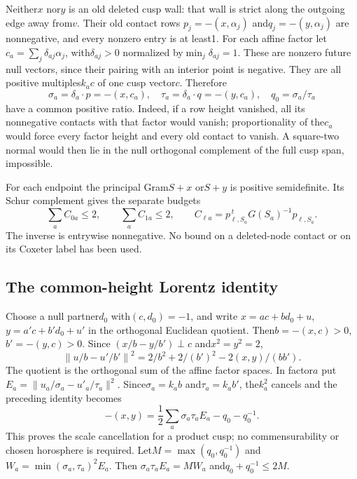 \documentclass[11pt]{article}
\theoremstyle{remark}\newtheorem{remark}[theorem]{Remark}
\begin{document}
Neither$x$ nor$y$ is an old deleted cusp wall: that wall is strict
along the outgoing edge away from$v$. Their old contact rows
$p_j=-(x,\alpha_j)$ and$q_j=-(y,\alpha_j)$ are nonnegative,
and every nonzero entry is at least1. For each affine factor let
$c_a=\sum_j\delta_{aj}\alpha_j$, with$\delta_{aj}>0$ normalized
by$\min_j\delta_{aj}=1$. These are nonzero future null vectors,
since their pairing with an interior point is negative. They are
all positive multiples$k_ac$ of one cusp vector$c$. Therefore
\[
 \sigma_a=\delta_a\cdot p=-(x,c_a),\quad
 \tau_a=\delta_a\cdot q=-(y,c_a),\quad
 q_0=\sigma_a/\tau_a
\]
have a common positive ratio. Indeed, if a row height vanished,
all its nonnegative contacts with that factor would vanish;
proportionality of the$c_a$ would force every factor height and
every old contact to vanish. A square-two normal would then lie
in the null orthogonal complement of the full cusp span, impossible.

For each endpoint the principal Gram$S+x$ or$S+y$ is positive
semidefinite. Its Schur complement gives the separate budgets
\begin{equation}\label{eq:two-budgets}
 \sum_aC_{0a}\le2,\qquad\sum_aC_{1a}\le2,\qquad
 C_{\ell a}=p_{\ell,S_a}^{\,t}G(S_a)^{-1}p_{\ell,S_a}.
\end{equation}
The inverse is entrywise nonnegative. No bound on a deleted-node
contact or on its Coxeter label has been used.

\subsection{The common-height Lorentz identity}

Choose a null partner$d_0$ with$(c,d_0)=-1$, and write
$x=a c+b d_0+u$, $y=a'c+b'd_0+u'$ in the orthogonal Euclidean
quotient. Then$b=-(x,c)>0$, $b'=-(y,c)>0$. Since
$(x/b-y/b')\perp c$ and$x^2=y^2=2$,
\[
 \left\|u/b-u'/b'\right\|^2
   =2/b^2+2/(b')^2-2(x,y)/(bb').
\]
The quotient is the orthogonal sum of the affine factor spaces.
In factor$a$ put
$E_a=\|u_a/\sigma_a-u'_a/\tau_a\|^2$.
Since$\sigma_a=k_ab$ and$\tau_a=k_ab'$, the$k_a^2$ cancels and
the preceding identity becomes
\begin{equation}\label{eq:lorentz-product}
 -(x,y)=\frac12\sum_a\sigma_a\tau_aE_a-q_0-q_0^{-1}.
\end{equation}
This proves the scale cancellation for a product cusp; no
commensurability or chosen horosphere is required.
Let$M=\max(q_0,q_0^{-1})$ and
$W_a=\min(\sigma_a,\tau_a)^2E_a$. Then
$\sigma_a\tau_aE_a=MW_a$ and$q_0+q_0^{-1}\le2M$.
\end{document}
